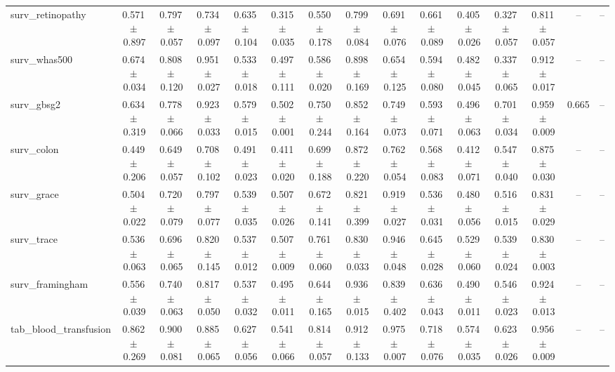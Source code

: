 \documentclass[8pt]{extarticle}
\begin{document}
\begin{longtable}{l*{14}{c}}
surv\_retinopathy & 0.571\,$\pm$\,0.897 & 0.797\,$\pm$\,0.057 & 0.734\,$\pm$\,0.097 & 0.635\,$\pm$\,0.104 & 0.315\,$\pm$\,0.035 & 0.550\,$\pm$\,0.178 & 0.799\,$\pm$\,0.084 & 0.691\,$\pm$\,0.076 & 0.661\,$\pm$\,0.089 & 0.405\,$\pm$\,0.026 & 0.327\,$\pm$\,0.057 & 0.811\,$\pm$\,0.057 & -- & -- \\
surv\_whas500 & 0.674\,$\pm$\,0.034 & 0.808\,$\pm$\,0.120 & 0.951\,$\pm$\,0.027 & 0.533\,$\pm$\,0.018 & 0.497\,$\pm$\,0.111 & 0.586\,$\pm$\,0.020 & 0.898\,$\pm$\,0.169 & 0.654\,$\pm$\,0.125 & 0.594\,$\pm$\,0.080 & 0.482\,$\pm$\,0.045 & 0.337\,$\pm$\,0.065 & 0.912\,$\pm$\,0.017 & -- & -- \\
surv\_gbsg2 & 0.634\,$\pm$\,0.319 & 0.778\,$\pm$\,0.066 & 0.923\,$\pm$\,0.033 & 0.579\,$\pm$\,0.015 & 0.502\,$\pm$\,0.001 & 0.750\,$\pm$\,0.244 & 0.852\,$\pm$\,0.164 & 0.749\,$\pm$\,0.073 & 0.593\,$\pm$\,0.071 & 0.496\,$\pm$\,0.063 & 0.701\,$\pm$\,0.034 & 0.959\,$\pm$\,0.009 & 0.665 & -- \\
surv\_colon & 0.449\,$\pm$\,0.206 & 0.649\,$\pm$\,0.057 & 0.708\,$\pm$\,0.102 & 0.491\,$\pm$\,0.023 & 0.411\,$\pm$\,0.020 & 0.699\,$\pm$\,0.188 & 0.872\,$\pm$\,0.220 & 0.762\,$\pm$\,0.054 & 0.568\,$\pm$\,0.083 & 0.412\,$\pm$\,0.071 & 0.547\,$\pm$\,0.040 & 0.875\,$\pm$\,0.030 & -- & -- \\
surv\_grace & 0.504\,$\pm$\,0.022 & 0.720\,$\pm$\,0.079 & 0.797\,$\pm$\,0.077 & 0.539\,$\pm$\,0.035 & 0.507\,$\pm$\,0.026 & 0.672\,$\pm$\,0.141 & 0.821\,$\pm$\,0.399 & 0.919\,$\pm$\,0.027 & 0.536\,$\pm$\,0.031 & 0.480\,$\pm$\,0.056 & 0.516\,$\pm$\,0.015 & 0.831\,$\pm$\,0.029 & -- & -- \\
surv\_trace & 0.536\,$\pm$\,0.063 & 0.696\,$\pm$\,0.065 & 0.820\,$\pm$\,0.145 & 0.537\,$\pm$\,0.012 & 0.507\,$\pm$\,0.009 & 0.761\,$\pm$\,0.060 & 0.830\,$\pm$\,0.033 & 0.946\,$\pm$\,0.048 & 0.645\,$\pm$\,0.028 & 0.529\,$\pm$\,0.060 & 0.539\,$\pm$\,0.024 & 0.830\,$\pm$\,0.003 & -- & -- \\
surv\_framingham & 0.556\,$\pm$\,0.039 & 0.740\,$\pm$\,0.063 & 0.817\,$\pm$\,0.050 & 0.537\,$\pm$\,0.032 & 0.495\,$\pm$\,0.011 & 0.644\,$\pm$\,0.165 & 0.936\,$\pm$\,0.015 & 0.839\,$\pm$\,0.402 & 0.636\,$\pm$\,0.043 & 0.490\,$\pm$\,0.011 & 0.546\,$\pm$\,0.023 & 0.924\,$\pm$\,0.013 & -- & -- \\
tab\_blood\_transfusion & 0.862\,$\pm$\,0.269 & 0.900\,$\pm$\,0.081 & 0.885\,$\pm$\,0.065 & 0.627\,$\pm$\,0.056 & 0.541\,$\pm$\,0.066 & 0.814\,$\pm$\,0.057 & 0.912\,$\pm$\,0.133 & 0.975\,$\pm$\,0.007 & 0.718\,$\pm$\,0.076 & 0.574\,$\pm$\,0.035 & 0.623\,$\pm$\,0.026 & 0.956\,$\pm$\,0.009 & -- & -- \\

\end{longtable}
\end{document}

